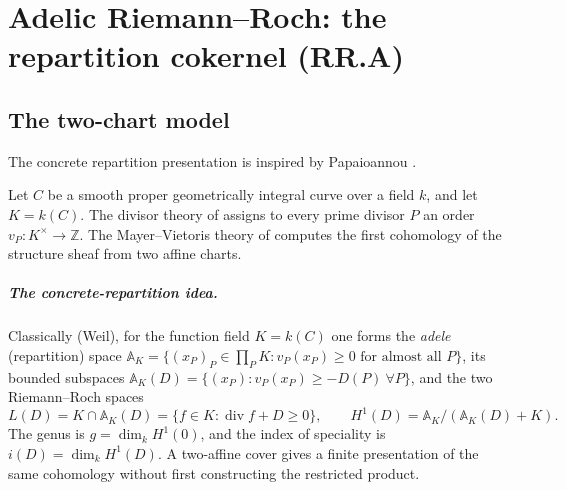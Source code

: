 \chapter{Adelic Riemann--Roch: the repartition cokernel (RR.A)}
\label{chap:RiemannRoch_Adelic}

\section{The two-chart model}
\label{sec:RiemannRoch_Adelic_intro}
The concrete repartition presentation is inspired by Papaioannou \cite{papaioannou-rr}.

Let \(C\) be a smooth proper geometrically integral curve over a field
\(k\), and let \(K=k(C)\).  The divisor theory of
 assigns to every prime divisor \(P\)
an order \(v_P\colon K^\times\to\mathbb Z\).  The Mayer--Vietoris theory
of  computes the first cohomology of
the structure sheaf from two affine charts.

\paragraph{The concrete-repartition idea.}
Classically (Weil), for the function field \(K = k(C)\) one forms the
\emph{adele} (repartition) space
\(\mathbb{A}_K = \{(x_P)_P \in \prod_P K : v_P(x_P) \ge 0 \text{ for
almost all } P\}\), its bounded subspaces
\(\mathbb{A}_K(D) = \{(x_P) : v_P(x_P) \ge -D(P)\ \forall P\}\), and the
two Riemann--Roch spaces
\[
  L(D) = K \cap \mathbb{A}_K(D)
        = \{ f \in K : \operatorname{div} f + D \ge 0\},
  \qquad
  H^1(D) = \mathbb{A}_K / (\mathbb{A}_K(D) + K).
\]
The genus is \(g=\dim_k H^1(0)\), and the index of speciality is
\(i(D)=\dim_k H^1(D)\).  A two-affine cover gives a finite presentation
of the same cohomology without first constructing the restricted product.

